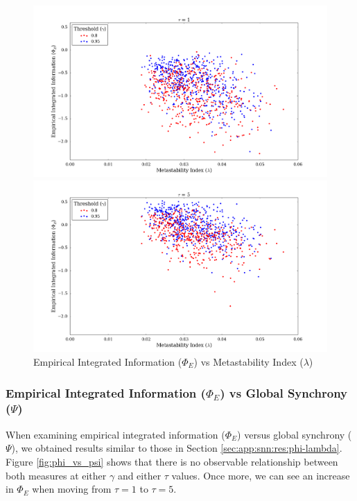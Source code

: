 \documentclass[a4paper,11pt]{article}
\begin{document}
\begin{figure}[H] 
	\begin{minipage}[b]{0.5\linewidth}
		\begin{center}
		\includegraphics[scale = 0.2]{figures/snn/phi_vs_lambda_1}
		\end{center}
		\vspace{4ex}
	\end{minipage}
	\begin{minipage}[b]{0.5\linewidth}
		\begin{center}
		\includegraphics[scale = 0.2]{figures/snn/phi_vs_lambda_5}
		\end{center}
		\vspace{4ex}
	\end{minipage}
	\caption{
		Empirical Integrated Information ($\Phi_E$) vs Metastability Index ($\lambda$)
		\label{fig:phi_vs_lambda}
	}
\end{figure}

\subsubsection{Empirical Integrated Information ($\Phi_E$) vs Global Synchrony ($\Psi$)}
\label{sec:app:snn:res:phi-sync}
When examining empirical integrated information ($\Phi_E$) versus global synchrony ($\Psi$), we obtained results similar to those in Section \ref{sec:app:snn:res:phi-lambda}. Figure \ref{fig:phi_vs_psi} shows that there is no observable relationship between both measures at either $\gamma$ and either $\tau$ values. Once more, we can see an increase in $\Phi_E$ when moving from $\tau = 1$ to $\tau = 5$.
\end{document}
